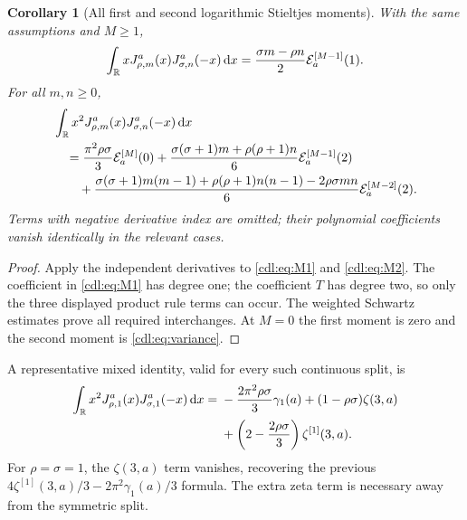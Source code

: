 \documentclass[11pt,letterpaper]{article}
\numberwithin{equation}{section}
\newtheorem{corollary}[theorem]{Corollary}
\theoremstyle{definition}\newtheorem{definition}[theorem]{Definition}
\theoremstyle{remark}\newtheorem{remark}[theorem]{Remark}
\begin{document}
\begin{corollary}[All first and second logarithmic Stieltjes moments]
\label{cdl:cor:Jmoments}
With the same assumptions and $M\ge1$,
\begin{equation}\label{cdl:eq:Jfirst}
 \int_\mathbb R xJ_{\rho,m}^a(x)J_{\sigma,n}^a(-x)\,\mathrm d x
 =\frac{\sigma m-\rho n}{2}\mathcal E_a^{[M-1]}(1).
\end{equation}
For all $m,n\ge0$,
\begin{equation}\label{cdl:eq:Jsecond}
 \begin{split}
 &\int_\mathbb R x^2J_{\rho,m}^a(x)J_{\sigma,n}^a(-x)\,\mathrm d x\\
 &\quad=\frac{\pi^2\rho\sigma}{3}\mathcal E_a^{[M]}(0)
 +\frac{\sigma(\sigma+1)m+\rho(\rho+1)n}{6}\mathcal E_a^{[M-1]}(2)\\
 &\qquad+\frac{\sigma(\sigma+1)m(m-1)+\rho(\rho+1)n(n-1)-2\rho\sigma mn}{6}
    \mathcal E_a^{[M-2]}(2).
 \end{split}
\end{equation}
Terms with negative derivative index are omitted; their polynomial
coefficients vanish identically in the relevant cases.
\end{corollary}
\begin{proof}
Apply the independent derivatives to \eqref{cdl:eq:M1} and
\eqref{cdl:eq:M2}. The coefficient in \eqref{cdl:eq:M1} has degree one;
the coefficient $T$ has degree two, so only the three displayed product
rule terms can occur. The weighted Schwartz estimates prove all required
interchanges. At $M=0$ the first moment is zero and the second moment
is \eqref{cdl:eq:variance}.
\end{proof}

A representative mixed identity, valid for every such continuous split, is
\begin{equation}\label{cdl:eq:J11}
 \begin{split}
 \int_\mathbb R x^2J_{\rho,1}^a(x)J_{\sigma,1}^a(-x)\,\mathrm d x
 ={}&-\frac{2\pi^2\rho\sigma}{3}\gamma_1(a)
 +(1-\rho\sigma)\zeta(3,a)\\
 &+\left(2-\frac{2\rho\sigma}{3}\right)\zeta^{[1]}(3,a).
 \end{split}
\end{equation}
For $\rho=\sigma=1$, the $\zeta(3,a)$ term vanishes, recovering the
previous $4\zeta^{[1]}(3,a)/3-2\pi^2\gamma_1(a)/3$ formula.
The extra zeta term is necessary away from the symmetric split.
\end{document}
